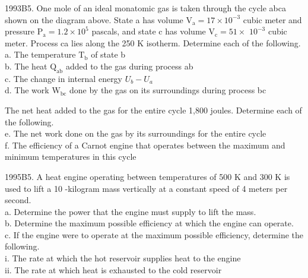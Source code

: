 \begin{enumerate}
1993B5. One mole of an ideal monatomic gas is taken through the cycle abca shown on the diagram above. State a has volume $\mathrm{V}_{\mathrm{a}}=17 \times 10^{-3}$ cubic meter and pressure $\mathrm{P}_{\mathrm{a}}=1.2 \times 10^{5}$ pascals, and state c has volume $\mathrm{V}_{\mathrm{c}}=51 \times$ $10^{-3}$ cubic meter. Process ca lies along the 250 K isotherm. Determine each of the following.\\
a. The temperature $\mathrm{T}_{\mathrm{b}}$ of state b\\
b. The heat $\mathrm{Q}_{\mathrm{ab}}$ added to the gas during process ab\\
c. The change in internal energy $U_{b}-U_{a}$\\
d. The work $\mathrm{W}_{\mathrm{bc}}$ done by the gas on its surroundings during process bc

The net heat added to the gas for the entire cycle 1,800 joules. Determine each of the following.\\
e. The net work done on the gas by its surroundings for the entire cycle\\
f. The efficiency of a Carnot engine that operates between the maximum and minimum temperatures in this cycle

1995B5. A heat engine operating between temperatures of 500 K and 300 K is used to lift a 10 -kilogram mass vertically at a constant speed of 4 meters per second.\\
a. Determine the power that the engine must supply to lift the mass.\\
b. Determine the maximum possible efficiency at which the engine can operate.\\
c. If the engine were to operate at the maximum possible efficiency, determine the following.\\
i. The rate at which the hot reservoir supplies heat to the engine\\
ii. The rate at which heat is exhausted to the cold reservoir


\end{enumerate}
